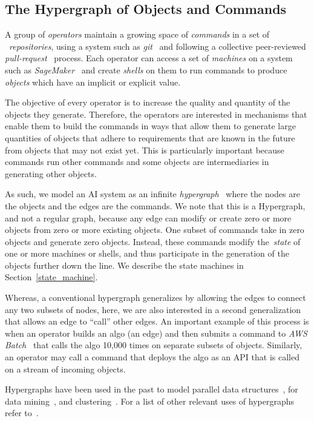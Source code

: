 \subsection{The Hypergraph of Objects and Commands}\label{hypergraph}

A group of \emph{operators} maintain a growing space of \emph{commands} in a set of ~\emph{repositories}, using a system such as \emph{git}~\cite{git} and following a collective peer-reviewed \emph{pull-request}~\cite{pull_request} process. Each operator can access a set of \emph{machines} on a system such as \emph{SageMaker}~\cite{sagemaker} and create \emph{shells} on them to run commands to produce \emph{objects} which have an implicit or explicit value.

The objective of every operator is to increase the quality and quantity of the objects they generate. Therefore, the operators are interested in mechanisms that enable them to build the commands in ways that allow them to generate large quantities of objects that adhere to requirements that are known in the future from objects that may not exist yet. This is particularly important because commands run other commands and some objects are intermediaries in generating other objects.

As such, we model an AI system as an infinite \emph{hypergraph}~\cite{Hypergraph13} where the nodes are the objects and the edges are the commands. We note that this is a Hypergraph, and not a regular graph, because any edge can modify or create zero or more objects from zero or more existing objects. One subset of commands take in zero objects and generate zero objects. Instead, these commands modify the~\emph{state} of one or more machines or shells, and thus participate in the generation of the objects further down the line. We describe the state machines in Section~\ref{state_machine}.

Whereas, a conventional hypergraph generalizes by allowing the edges to connect any two subsets of nodes, here, we are also interested in a second generalization that allows an edge to ``call'' other edges. An important example of this process is when an operator builds an algo (an edge) and then submits a command to \emph{AWS Batch}~\cite{aws_batch} that calls the algo 10,000 times on separate subsets of objects. Similarly, an operator may call a command that deploys the algo as an API that is called on a stream of incoming objects.

Hypergraphs have been used in the past to model parallel data structures~\cite{HK00}, for data mining~\cite{HBC07}, and clustering~\cite{BP09}. For a list of other relevant uses of hypergraphs refer to~\cite{Hypergraph13}.